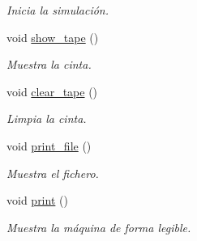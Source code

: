 \begin{DoxyCompactItemize}
\begin{DoxyCompactList}\small\item\em Inicia la simulación. \end{DoxyCompactList}\item 
\hypertarget{classturing__machine_a49120fa02f2272261c936e94ad21cefb}{}void \hyperlink{classturing__machine_a49120fa02f2272261c936e94ad21cefb}{show\+\_\+tape} ()\label{classturing__machine_a49120fa02f2272261c936e94ad21cefb}

\begin{DoxyCompactList}\small\item\em Muestra la cinta. \end{DoxyCompactList}\item 
\hypertarget{classturing__machine_a16222a07eb1695203391a3795cb68f29}{}void \hyperlink{classturing__machine_a16222a07eb1695203391a3795cb68f29}{clear\+\_\+tape} ()\label{classturing__machine_a16222a07eb1695203391a3795cb68f29}

\begin{DoxyCompactList}\small\item\em Limpia la cinta. \end{DoxyCompactList}\item 
\hypertarget{classturing__machine_a615c7d25a8f95a84000958d5466e8c8a}{}void \hyperlink{classturing__machine_a615c7d25a8f95a84000958d5466e8c8a}{print\+\_\+file} ()\label{classturing__machine_a615c7d25a8f95a84000958d5466e8c8a}

\begin{DoxyCompactList}\small\item\em Muestra el fichero. \end{DoxyCompactList}\item 
\hypertarget{classturing__machine_ab7a04417388f50c1c08c36b4ab0f6208}{}void \hyperlink{classturing__machine_ab7a04417388f50c1c08c36b4ab0f6208}{print} ()\label{classturing__machine_ab7a04417388f50c1c08c36b4ab0f6208}

\begin{DoxyCompactList}\small\item\em Muestra la máquina de forma legible. \end{DoxyCompactList}\end{DoxyCompactItemize}

